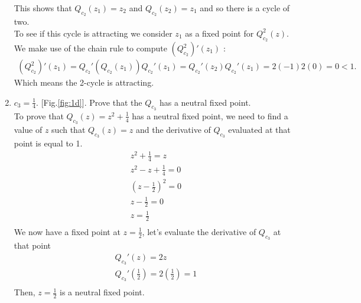 \documentclass[11pt]{article}
\begin{document}
\begin{enumerate}[label=(\alph{*})]
    This shows that $Q_{c_2}(z_1) = z_2$ and $Q_{c_2}(z_2) = z_1$ and so there is a cycle of two.\\
    To see if this cycle is attracting we consider $z_1$ as a fixed point for $Q^2_{c_2}(z)$. We make use of the chain rule
    to compute $(Q^2_{c_2})'(z_1)$ \cite{chaos}:
    \begin{equation}\label{eq:chain}
        \begin{split}
            (Q^2_{c_2})'(z_1) = Q_{c_2}'(Q_{c_2}(z_1))Q_{c_2}'(z_1) = Q_{c_2}'(z_2)Q_{c_2}'(z_1) = 2(-1) 2(0) = 0 < 1.
        \end{split}
    \end{equation}
    Which means the 2-cycle is attracting.

     \item $c_3 = \frac{1}{4}$. [Fig.\ref{fig:1d}]. Prove that the $Q_{c_3}$ has a neutral fixed point.\\
    To prove that $Q_{c_3}(z)=z^2+\frac{1}{4}$ has a neutral fixed point, we need to find a value of $z$ such that $Q_{c_3}(z) = z$ and the derivative of $Q_{c_3}$ evaluated at that point is equal to 1.
    \begin{equation}
        \begin{split}
            z^2 + \frac{1}{4} = z \\
            z^2 -z + \frac{1}{4} = 0 \\
            \left(z - \frac{1}{2}\right)^2 = 0 \\
            z - \frac{1}{2} = 0 \\
            z = \frac{1}{2} \\
        \end{split}
    \end{equation}
    We now have a fixed point at $z = \frac{1}{2}$, let's evaluate the derivative of $Q_{c_3}$ at that point
    \begin{equation}
        \begin{split}
            Q_{c_3}'\left(z\right) = 2z \\
            Q_{c_3}'\left(\frac{1}{2}\right) = 2 \left(\frac{1}{2}\right) = 1\\
        \end{split}
    \end{equation}
    Then, $z = \frac{1}{2}$ is a neutral fixed point.


\end{enumerate}
\end{document}
